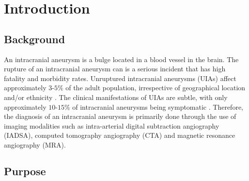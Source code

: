 \chapter{Introduction}



\section{Background}
An intracranial aneurysm is a bulge located in a blood vessel in the brain. The rupture of an intracranial aneurysm can is a serious incident that has high fatality and morbidity rates. Unruptured intracranial aneurysms  (UIAs) affect approximately $3$-$5 \% $ of the adult population, irrespective of geographical location and/or ethnicity \cite{vlak2011prevalence}. The clinical manifestations of UIAs are subtle, with only approximately $10$-$15\%$ of intracranial aneurysms being symptomatic \cite{friedman2001small}. Therefore, the diagnosis of an intracranial aneurysm is primarily done through the use of imaging modalities such as intra-arterial digital subtraction angiography (IADSA), computed tomography angiography (CTA) and magnetic resonance angiography (MRA). 

\section{Purpose}






